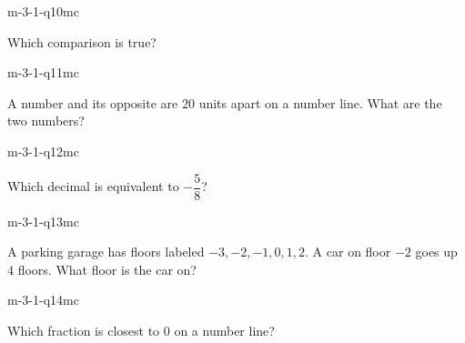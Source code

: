 \begin{practiceQuestion}{m-3-1-q10}{mc}
\begin{questionText}
Which comparison is true?
\end{questionText}
\end{practiceQuestion}

\begin{practiceQuestion}{m-3-1-q11}{mc}
\begin{questionText}
A number and its opposite are $20$ units apart on a number line. What are the two numbers?
\end{questionText}
\end{practiceQuestion}

\begin{practiceQuestion}{m-3-1-q12}{mc}
\begin{questionText}
Which decimal is equivalent to $-\dfrac{5}{8}$?
\end{questionText}
\end{practiceQuestion}

\begin{practiceQuestion}{m-3-1-q13}{mc}
\begin{questionText}
A parking garage has floors labeled $-3, -2, -1, 0, 1, 2$. A car on floor $-2$ goes up $4$ floors. What floor is the car on?
\end{questionText}
\end{practiceQuestion}

\begin{practiceQuestion}{m-3-1-q14}{mc}
\begin{questionText}
Which fraction is closest to $0$ on a number line?
\end{questionText}
\end{practiceQuestion}

